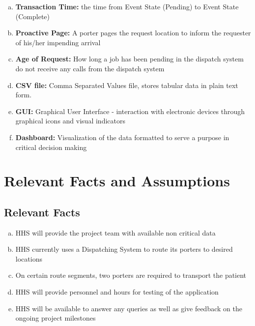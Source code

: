 \documentclass[paper=letter, fontsize=10pt]{scrartcl}
\numberwithin{equation}{section}		%
\numberwithin{figure}{section}			%
\numberwithin{table}{section}				%
\begin{document}
\begin{enumerate}[(a)]
	\item \textbf{Transaction Time:} the time from Event State (Pending) to Event State (Complete)
	\item \textbf{Proactive Page:} A porter pages the request location to inform the requester of his/her impending arrival      
	\item \textbf{Age of Request:} How long a job has been pending in the dispatch system
	 do not receive any calls from the dispatch system
	\item \textbf{CSV file:} Comma Separated Values file, stores tabular data in plain text form. 
	\item \textbf{GUI:} Graphical User Interface - interaction with electronic devices through graphical icons and visual indicators
	\item \textbf{Dashboard:} Visualization of the data formatted to serve a purpose in critical decision making
\end{enumerate}

\section{Relevant Facts and Assumptions}
\subsection{Relevant Facts}
\begin{enumerate}[(a)]
	\item HHS will provide the project team with available non critical data
	\item HHS currently uses a Dispatching System to route its porters to desired locations
	\item On certain route segments, two porters are required to transport the patient 
	\item HHS will provide personnel and hours for testing of the application
	\item HHS will be available to answer any queries as well as give feedback on the ongoing project milestones
\end{enumerate}
\end{document}
